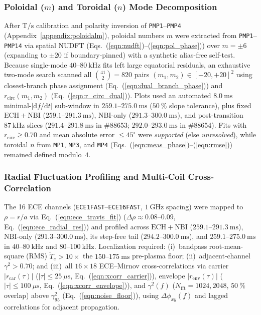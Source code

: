\subsubsection{Poloidal (\texorpdfstring{$m$}{m}) and Toroidal (\texorpdfstring{$n$}{n}) Mode Decomposition}
After $\mathrm{T/s}$ calibration and polarity inversion of \texttt{PMP1}--\texttt{PMP4} (Appendix~\ref{appendix:poloidalm}), poloidal numbers $m$ were extracted from \texttt{PMP1}--\texttt{PMP14} via spatial NUDFT (Eqs.~(\ref{eqn:nudft})--(\ref{eqn:pol_phase})) \cite{dutt1993fast, Klein2008} over $m = \pm 6$ (expanding to $\pm 20$ if boundary-pinned) with a synthetic alias-free self-test. Because single-mode $40\text{--}80~\mathrm{kHz}$ fits left large equatorial residuals, an exhaustive two-mode search scanned all $\binom{41}{2} = 820$ pairs $(m_1, m_2) \in [-20, +20]^2$ using closest-branch phase assignment (Eq.~(\ref{eqn:dual_branch_phase})) and $r_{\mathrm{circ}}(m_1, m_2)$ (Eq.~(\ref{eqn:r_circ_dual})). Plots used an automated $8.0~\mathrm{ms}$ minimal-$|\mathrm{d}f/\mathrm{d}t|$ sub-window in $259.1\text{--}275.0~\mathrm{ms}$ ($50~\%$ slope tolerance), plus fixed $\mathrm{ECH}+\mathrm{NBI}$ ($259.1\text{--}291.3~\mathrm{ms}$), $\mathrm{NBI}$-only ($291.3\text{--}300.0~\mathrm{ms}$), and post-transition $87~\mathrm{kHz}$ slices ($291.4\text{--}291.8~\mathrm{ms}$ in \#88653; $292.0\text{--}293.0~\mathrm{ms}$ in \#88654). Fits with $r_{\mathrm{circ}} \ge 0.70$ and mean absolute error $\le 45^\circ$ were \emph{supported} (else \emph{unresolved}), while toroidal $n$ from \texttt{MP1}, \texttt{MP3}, and \texttt{MP4} (Eqs.~(\ref{eqn:meas_phase})--(\ref{eqn:rmse})) remained defined modulo~$4$.

\subsubsection{Radial Fluctuation Profiling and Multi-Coil Cross-Correlation}
\label{subsubsec:method_ece_radial}
\begin{sloppypar}
The 16 ECE channels (\texttt{ECE1FAST}--\allowbreak\texttt{ECE16FAST}, $1~\mathrm{GHz}$ spacing) \cite{luo2020measurement, Weir2019} were mapped to $\rho = r/a$ via Eq.~(\ref{eqn:ece_travis_fit}) ($\Delta \rho \approx 0.08\text{--}0.09$, Eq.~(\ref{eqn:ece_radial_res})) and profiled across $\mathrm{ECH}+\mathrm{NBI}$ ($259.1\text{--}291.3~\mathrm{ms}$), $\mathrm{NBI}$-only ($291.3\text{--}300.0~\mathrm{ms}$), its step-free tail ($294.2\text{--}300.0~\mathrm{ms}$), and $259.1\text{--}275.0~\mathrm{ms}$ in $40\text{--}80~\mathrm{kHz}$ and $80\text{--}100~\mathrm{kHz}$. Localization required: (i)~bandpass root-mean-square (RMS) $\tilde{T}_e > 10\times$ the $150\text{--}175~\mathrm{ms}$ pre-plasma floor; (ii)~adjacent-channel $\gamma^2 > 0.70$; and (iii)~all $16 \times 18$ ECE--Mirnov cross-correlations via carrier $|r_{\mathrm{car}}(\tau)|$ ($|\tau| \le 25~\mu\mathrm{s}$, Eq.~(\ref{eqn:xcorr_carrier})), envelope $|r_{\mathrm{env}}(\tau)|$ ($|\tau| \le 100~\mu\mathrm{s}$, Eq.~(\ref{eqn:xcorr_envelope})), and $\gamma^2(f)$ ($N_{\mathrm{fft}} = 1024, 2048$, $50~\%$ overlap) above $\gamma_{95}^2$ (Eq.~(\ref{eqn:noise_floor})), using $\Delta\phi_{xy}(f)$ and lagged correlations for adjacent propagation.
\end{sloppypar}

